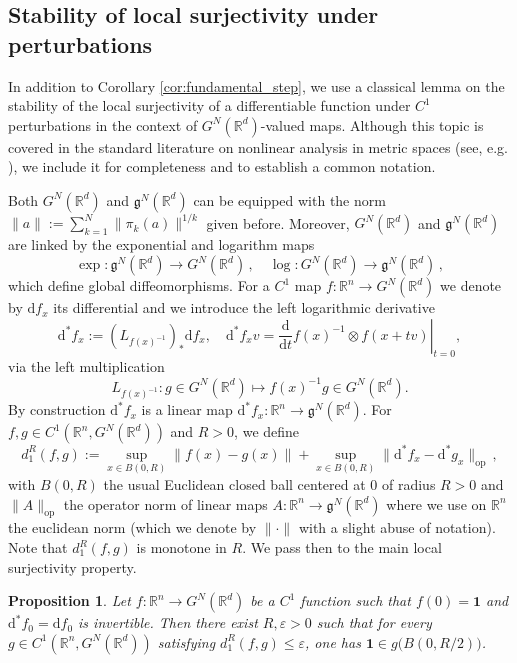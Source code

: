 \documentclass[12pt,a4paper]{article}
\numberwithin{equation}{section}
\def\bR{\mathbb{R}}\def\bS{\mathbb{S}}
\theoremstyle{plain}
\newtheorem{proposition}[theorem]{Proposition}
\theoremstyle{definition}
\theoremstyle{remark}
\begin{document}
\subsection{Stability of local surjectivity under perturbations}

In addition to Corollary \ref{cor:fundamental_step}, we use a classical lemma on the stability of the local surjectivity of a differentiable function under $C^1$ perturbations in the context of $G^N(\bR^d)$-valued maps. Although this topic is covered in the standard literature on nonlinear analysis in metric spaces (see, e.g. \cite{implicit_book}), we include it for completeness and to establish a common notation.

Both $G^N(\mathbb{R}^d)$ and $\mathfrak{g}^N(\mathbb{R}^d)$ can be equipped with the norm $\|a\| := \sum_{k=1}^N \|\pi_k(a)\|^{1/k}$ given before. Moreover, $G^N(\mathbb{R}^d)$ and $\mathfrak{g}^N(\mathbb{R}^d)$ are linked by the exponential and logarithm maps
\[
\exp : \mathfrak{g}^N(\mathbb{R}^d) \to G^N(\mathbb{R}^d)\,,\quad
\log : G^N(\mathbb{R}^d) \to \mathfrak{g}^N(\mathbb{R}^d)\,,
\]
which define global diffeomorphisms. For a $C^1$ map $f:\bR^n \to G^N(\bR^d)$ we denote by $\mathrm{d}f_x$ its differential and we introduce the left logarithmic derivative
\[
\mathrm{d}^* f_x := (L_{f(x)^{-1}})_* \mathrm{d}f_x,
\quad 
\mathrm{d}^* f_x v = \left.\frac{\mathrm{d}}{\mathrm{d}t} f(x)^{-1}\otimes f(x+tv)\right|_{t=0},
\]
via the left multiplication
\[
L_{f(x)^{-1}} : g\in G^N(\mathbb R^d)\mapsto f(x)^{-1}g\in G^N(\mathbb R^d).
\]
By construction $\mathrm{d}^* f_x$ is a linear map $\mathrm{d}^* f_x\colon \mathbb{R}^n \to \mathfrak{g}^N(\mathbb{R}^d)$. For $f,g \in C^1(\mathbb{R}^n, G^N(\mathbb{R}^d))$ and $R>0$, we define
\begin{equation}\label{eq_loc_C1_norm}
d_1^R(f,g) := \sup_{x \in B(0,R)} \|f(x)-g(x)\|
+ \sup_{x \in B(0,R)} \|\mathrm{d}^* f_x - \mathrm{d}^* g_x\|_{\text{op}}\,,
\end{equation}
with $B(0,R)$ the usual Euclidean closed 	ball centered at $0$ of radius $R>0$ and $\|A\|_{\text{op}}$ the operator norm of linear maps $A\colon\mathbb{R}^n \to \mathfrak{g}^N(\mathbb{R}^d)$ where we use on $\mathbb{R}^n$ the euclidean norm (which we denote by $\|\cdot\|$ with a slight abuse of notation). Note that $d_1^R(f,g)$ is monotone in $R$. We pass then to the main local surjectivity property.

\begin{proposition}\label{inversion}
Let $f\colon \mathbb{R}^n \to G^N(\mathbb{R}^d)$ be a $C^1$ function such that
$f(0)=\mathbf{1}$ and $\mathrm{d}^* f_0=\mathrm{d}f_0$ is invertible. Then there exist $R,\varepsilon>0$ such that for every $g \in C^1(\mathbb{R}^n,G^N(\mathbb{R}^d))$ satisfying
$ d_1^R(f,g) \le \varepsilon$,
one has $\mathbf{1}\in g\big(B(0,R/2)\big)$.
\end{proposition}
\end{document}
